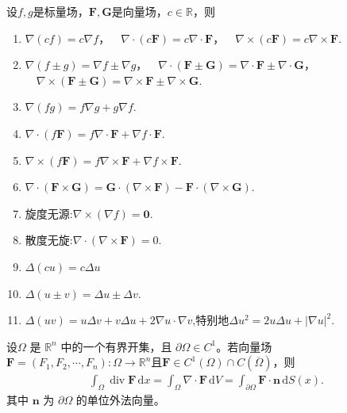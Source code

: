\documentclass[../../main.tex]{subfiles}%
\begin{document}
\begin{theorem}\label{theorem:散度旋度Laplace算子的性质}
设$f,g$是标量场，$\bm{F},\bm{G}$是向量场，$c\in \mathbb{R}$，则
\begin{enumerate}[(1)]
\item\label{theorem:散度旋度Laplace算子的性质-1} $\nabla(cf)=c\nabla f$，$\quad \nabla\cdot(c\bm{F})=c\nabla\cdot\bm{F}$，$\quad \nabla\times(c\bm{F})=c\nabla\times\bm{F}$.

\item\label{theorem:散度旋度Laplace算子的性质-2} $\nabla(f\pm g)=\nabla f\pm\nabla g$，$\quad \nabla\cdot(\bm{F}\pm\bm{G})=\nabla\cdot\bm{F}\pm\nabla\cdot\bm{G}$，$\quad \nabla\times(\bm{F}\pm\bm{G})=\nabla\times\bm{F}\pm\nabla\times\bm{G}$.

\item\label{theorem:散度旋度Laplace算子的性质-3} $\nabla(fg)=f\nabla g+g\nabla f$.

\item\label{theorem:散度旋度Laplace算子的性质-4} $\nabla\cdot(f\bm{F})=f\nabla\cdot\bm{F}+\nabla f\cdot\bm{F}$.

\item\label{theorem:散度旋度Laplace算子的性质-5} $\nabla\times(f\bm{F})=f\nabla\times\bm{F}+\nabla f\times\bm{F}$.

\item\label{theorem:散度旋度Laplace算子的性质-6} $\nabla\cdot(\bm{F}\times\bm{G})=\bm{G}\cdot(\nabla\times\bm{F})-\bm{F}\cdot(\nabla\times\bm{G})$.

\item\label{theorem:散度旋度Laplace算子的性质-7} 旋度无源:$\nabla\times(\nabla f)=\bm{0}$.

\item\label{theorem:散度旋度Laplace算子的性质-8} 散度无旋:$\nabla\cdot(\nabla\times\bm{F})=0$.

\item\label{theorem:散度旋度Laplace算子的性质-9} $\Delta(cu)=c\Delta u$
\item $\Delta(u\pm v)=\Delta u\pm\Delta v$.

\item\label{theorem:散度旋度Laplace算子的性质-10} $\Delta(uv)=u\Delta v+v\Delta u+2\nabla u\cdot\nabla v$,特别地$\Delta u^2=2u\Delta u+\left| \nabla u \right|^2.$
\end{enumerate}
\end{theorem}

\begin{theorem}\label{theorem:Gauss-Green公式(散度定理)}
设$\Omega$ 是 $\mathbb{R}^n$ 中的一个有界开集，且 $\partial\Omega\in C^1$。若向量场 $\bm{F}=(F_1,F_2,\cdots,F_n):\Omega\to\mathbb{R}^n$且$\bm{F}\in C^1(\Omega)\cap C(\overline{\Omega})$，则
\begin{align*}
\int_\Omega \operatorname{div} \bm{F}\,\mathrm{d}x =\int_{\Omega}\nabla\cdot\bm{F}\,\mathrm{d}V= \int_{\partial\Omega} \bm{F}\cdot \bm{n}\,\mathrm{d}S(x).
\end{align*}
其中 $\bm{n}$ 为 $\partial\Omega$ 的单位外法向量。
\end{theorem}
\end{document}
